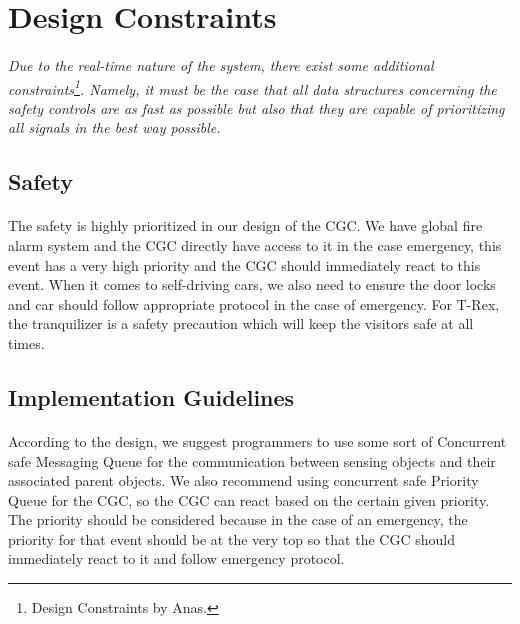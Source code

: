\documentclass[12pt]{article}
\begin{document}
    
    
    
\section{Design Constraints} \label{cons}
\paragraph{} \textit{Due to the real-time nature of the system, there exist some additional 
constraints\footnote{Design Constraints by Anas.}. Namely, it must be the case that all data 
structures concerning the safety controls are as fast as possible but also that they are capable 
of prioritizing all signals in the best way possible.}

    \subsection{Safety}
    \paragraph{} The safety is highly prioritized in our design of the CGC. We have 
    global fire alarm system and the CGC directly have access to it in the case 
    emergency, this event has a very high priority and the CGC 
    should immediately react to this event. When it comes to self-driving cars, we also need to ensure the door locks
    and car should follow appropriate protocol in the case of emergency. For T-Rex, the tranquilizer is a safety precaution which will 
    keep the visitors safe at all times.

    \subsection{Implementation Guidelines}
    \paragraph{} According to the design, we suggest programmers to use some sort of 
    Concurrent safe Messaging Queue for the communication between sensing objects and 
    their associated parent objects. We also recommend using concurrent safe Priority 
    Queue for the CGC, so the CGC can react based on the certain given priority. The 
    priority should be considered because in the case of an emergency, the priority 
    for that event should be at the very top so that the CGC should immediately react 
    to it and follow emergency protocol.
\end{document}
